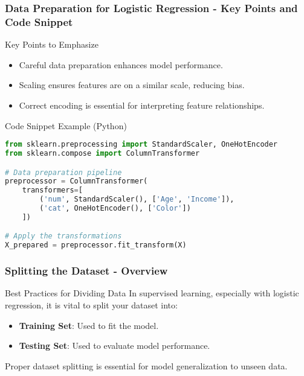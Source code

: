 \documentclass[aspectratio=169]{beamer}
\begin{document}
\begin{frame}[fragile]
  \frametitle{Data Preparation for Logistic Regression - Key Points and Code Snippet}
  \begin{block}{Key Points to Emphasize}
    \begin{itemize}
      \item Careful data preparation enhances model performance.
      \item Scaling ensures features are on a similar scale, reducing bias.
      \item Correct encoding is essential for interpreting feature relationships.
    \end{itemize}
  \end{block}
  
  \begin{block}{Code Snippet Example (Python)}
    \begin{lstlisting}[language=Python]
from sklearn.preprocessing import StandardScaler, OneHotEncoder
from sklearn.compose import ColumnTransformer

# Data preparation pipeline
preprocessor = ColumnTransformer(
    transformers=[
        ('num', StandardScaler(), ['Age', 'Income']),
        ('cat', OneHotEncoder(), ['Color'])
    ])

# Apply the transformations
X_prepared = preprocessor.fit_transform(X)
    \end{lstlisting}
  \end{block}
\end{frame}

\begin{frame}[fragile]
  \frametitle{Splitting the Dataset - Overview}
  \begin{block}{Best Practices for Dividing Data}
    In supervised learning, especially with logistic regression, it is vital to split your dataset into:
    \begin{itemize}
      \item \textbf{Training Set}: Used to fit the model.
      \item \textbf{Testing Set}: Used to evaluate model performance.
    \end{itemize}
    Proper dataset splitting is essential for model generalization to unseen data.
  \end{block}
\end{frame}
\end{document}
